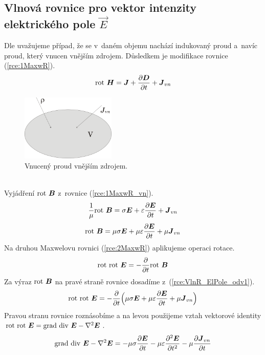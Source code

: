 \subsection{Vlnová rovnice pro vektor intenzity elektrického pole $\vec E$}
Dle \cite[str. 33]{emp} uvažujeme případ, že se v~daném objemu nachází indukovaný proud a~navíc proud, který vnucen vnějším zdrojem. Důsledkem je modifikace rovnice (\ref{rce:1MaxwR}).
\begin{equation}
	\mathrm{rot}\ \mbox{\boldmath$H$} = \mbox{\boldmath$J$}+\frac{\partial\mbox{\boldmath$D$}}{\partial t}+\mbox{\boldmath$J$}_{vn}
	\label{rce:1MaxwR_vn}
\end{equation}
\begin{figure}[!h]
	\centering
	\includegraphics[width=4.5cm]{vnuceny_I.png}
	\caption{Vnucený proud vnějším zdrojem.}
	\label{obr:vnuceny_I}
\end{figure}\\
Vyjádření $\mathrm{rot}\ \mbox{\boldmath$B$}$ z~rovnice (\ref{rce:1MaxwR_vn}).
\begin{displaymath}
	\frac{1}{\mu} \mathrm{rot}\ \mbox{\boldmath$B$} = \sigma \mbox{\boldmath$E$}+\varepsilon\frac{\partial\mbox{\boldmath$E$}}{\partial t}+\mbox{\boldmath$J$}_{vn}
\end{displaymath}
\begin{equation}
	\mathrm{rot}\ \mbox{\boldmath$B$} = \mu\sigma\mbox{\boldmath$E$}+\mu\varepsilon\frac{\partial\mbox{\boldmath$E$}}{\partial t}+\mu\mbox{\boldmath$J$}_{vn}
	\label{rce:VlnR_ElPole_odv1}
\end{equation}
Na druhou Maxwelovu rovnici (\ref{rce:2MaxwR}) aplikujeme operaci rotace.
\begin{displaymath}
	\mathrm{rot}\ \mathrm{rot}\ \mbox{\boldmath$E$} = -\frac{\partial}{\partial t}\mathrm{rot}\ \mbox{\boldmath$B$}
\end{displaymath}
Za výraz $\mathrm{rot}\ \mbox{\boldmath$B$}$ na pravé straně rovnice dosadíme z~(\ref{rce:VlnR_ElPole_odv1}).
\begin{displaymath}
	\mathrm{rot}\ \mathrm{rot}\ \mbox{\boldmath$E$} = -\frac{\partial}{\partial t}\Big(\mu\sigma\mbox{\boldmath$E$}+\mu\varepsilon\frac{\partial\mbox{\boldmath$E$}}{\partial t}+\mu\mbox{\boldmath$J$}_{vn}\Big)
\end{displaymath}
Pravou stranu rovnice roznásobíme a na levou použijeme vztah vektorové identity $\mathrm{rot}\ \mathrm{rot}\ \mbox{\boldmath$E$} = \mathrm{grad}\ \mathrm{div}\ \mbox{\boldmath$E$} - \nabla^{2}\mbox{\boldmath$E$}$. 
\begin{displaymath}
	\mathrm{grad}\ \mathrm{div}\ \mbox{\boldmath$E$} - \nabla^{2}\mbox{\boldmath$E$} = -\mu\sigma\frac{\partial\mbox{\boldmath$E$}}{\partial t}-\mu\varepsilon\frac{\partial^{2}\mbox{\boldmath$E$}}{\partial t^{2}}-\mu\frac{\partial\mbox{\boldmath$J$}_{vn}}{\partial t}
\end{displaymath}
